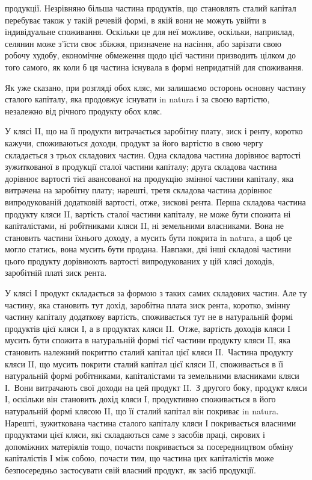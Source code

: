 \parcont{}  %
продукції. Незрівняно більша частина продуктів, що становлять сталий капітал
перебуває також у такій речевій формі, в якій вони не можуть увійти
в індивідуальне споживання. Оскільки це для неї можливе, оскільки, наприклад,
селянин може з’їсти своє збіжжя, призначене на насіння, або зарізати свою робочу
худобу, економічне обмеження щодо цієї частини призводить цілком до того
самого, як коли б ця частина існувала в формі непридатній для споживання.

Як уже сказано, при розгляді обох кляс, ми залишаємо осторонь основну
частину сталого капіталу, яка продовжує існувати in natura і за своєю вартістю,
незалежно від річного продукту обох кляс.

У клясі II, що на її продукти витрачається заробітну плату, зиск і ренту,
коротко кажучи, споживаються доходи, продукт за його вартістю в свою чергу
складається з трьох складових частин. Одна складова частина дорівнює вартості
зужиткованої в продукції сталої частини капіталу; друга складова частина дорівнює
вартості тієї авансованої на продукцію змінної частини капіталу, яка
витрачена на заробітну плату; нарешті, третя складова частина дорівнює випродукованій додатковій
вартості, отже, \deq{} зискові \dplus{} рента. Перша складова частина
продукту кляси II, вартість сталої частини капіталу, не може бути спожита
ні капіталістами, ні робітниками кляси II, ні земельними власниками. Вона не
становить частини їхнього доходу, а мусить бути покрита in natura, а щоб це
могло статись, вона мусить бути продана. Навпаки, дві інші складові частини
цього продукту дорівнюють вартості випродукованих у цій клясі доходів, \deq{} заробітній
платі \dplus{} зиск \dplus{} рента.

У клясі І продукт складається за формою з таких самих складових частин.
Але ту частину, яка становить тут дохід, заробітна плата \dplus{} зиск \dplus{} рента, коротко,
змінну частину капіталу \dplus{} додаткову вартість, споживається тут не
в натуральній формі продуктів цієї кляси І, а в продуктах кляси II.~Отже, вартість
доходів кляси І мусить бути спожита в натуральній формі тієї частини
продукту кляси II, яка становить належний покриттю сталий капітал цієї
кляси II.~Частина продукту кляси II, що мусить покрити сталий капітал цієї
кляси II, споживається в її натуральній формі робітниками, капіталістами та
земельними власниками кляси І.~Вони витрачають свої доходи на цей продукт II.~З другого боку, продукт кляси І, оскільки він становить дохід кляси І, продуктивно
споживається в його натуральній формі клясою II, що її сталий капітал
він покриває in natura. Нарешті, зужиткована частина сталого капіталу кляси
І покривається власними продуктами цієї кляси, які складаються саме з засобів
праці, сирових і допоміжних матеріялів тощо, почасти покривається за посередництвом
обміну капіталістів І між собою, почасти тим, що частина цих капіталістів
може безпосередньо застосувати свій власний продукт, як засіб продукції.

